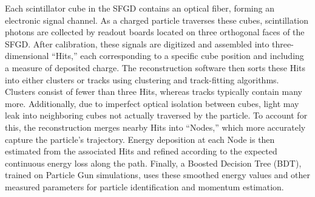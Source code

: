 Each scintillator cube in the SFGD contains an optical fiber, forming an electronic signal channel.  
As a charged particle traverses these cubes, scintillation photons are collected by readout boards located on three orthogonal faces of the SFGD.  
After calibration, these signals are digitized and assembled into three-dimensional “Hits,” each corresponding to a specific cube position and including a measure of deposited charge.  
The reconstruction software then sorts these Hits into either clusters or tracks using clustering and track-fitting algorithms.  
Clusters consist of fewer than three Hits, whereas tracks typically contain many more.  
Additionally, due to imperfect optical isolation between cubes, light may leak into neighboring cubes not actually traversed by the particle.  
To account for this, the reconstruction merges nearby Hits into “Nodes,” which more accurately capture the particle’s trajectory.  
Energy deposition at each Node is then estimated from the associated Hits and refined according to the expected continuous energy loss along the path.  
Finally, a Boosted Decision Tree (BDT), trained on Particle Gun simulations, uses these smoothed energy values and other measured parameters for particle identification and momentum estimation.  